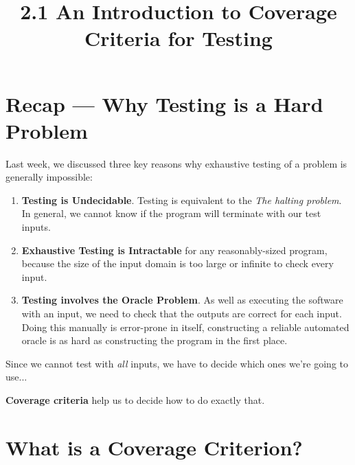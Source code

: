 



\title{2.1 An Introduction to Coverage Criteria for Testing}

\section{Recap --- Why Testing is a Hard Problem}


Last week, we discussed three key reasons why exhaustive testing of a problem is
generally impossible:


\begin{enumerate}


    \item {\bf Testing is Undecidable}. Testing is equivalent to the
    {\it The halting problem}. In general, we cannot know if the program will
    terminate with our test inputs.


    \item {\bf Exhaustive Testing is Intractable} for any reasonably-sized
    program, because the size of the input domain is too large or infinite to
    check every input.


    \item {\bf Testing involves the Oracle Problem}. As well as executing the
    software with an input, we need to check that the outputs are correct for
    each input. Doing this manually is error-prone in itself, constructing a
    reliable automated oracle is as hard as constructing the program in the
    first place.

\end{enumerate}

Since we cannot test with {\it all} inputs, we have to decide which ones we're
going to use... 

{\bf Coverage criteria} help us to decide how to do exactly that. 


\section{What is a Coverage Criterion?}

